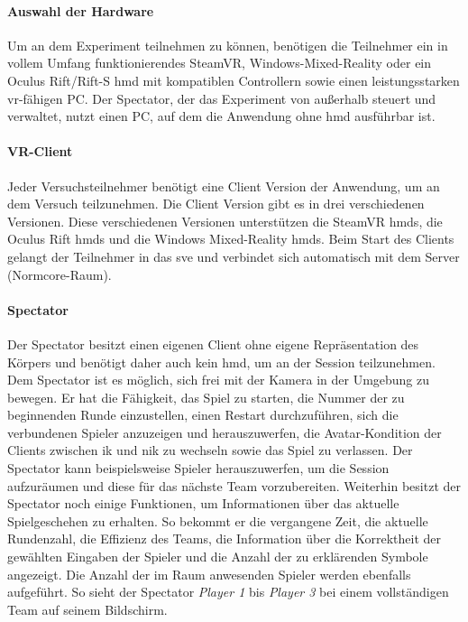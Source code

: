 \documentclass[a4paper,11pt]{article}%
\renewcommand{\\}{\vspace*{0.5\baselineskip} \newline}
\begin{document}
\paragraph{Auswahl der Hardware}
Um an dem Experiment teilnehmen zu können, benötigen die Teilnehmer ein in vollem Umfang funktionierendes SteamVR, Windows-Mixed-Reality oder ein Oculus Rift/Rift-S \ac{hmd} mit kompatiblen Controllern sowie einen leistungsstarken \ac{vr}-fähigen PC. Der Spectator, der das Experiment von außerhalb steuert und verwaltet, nutzt einen PC, auf dem die Anwendung ohne \ac{hmd} ausführbar ist.

\paragraph{VR-Client}
Jeder Versuchsteilnehmer benötigt eine Client Version der Anwendung, um an dem Versuch teilzunehmen. Die Client Version gibt es in drei verschiedenen Versionen. Diese verschiedenen Versionen unterstützen die SteamVR \ac{hmd}s, die Oculus Rift \ac{hmd}s und die Windows Mixed-Reality \ac{hmd}s. Beim Start des Clients gelangt der Teilnehmer in das \ac{sve} und verbindet sich automatisch mit dem Server (Normcore-Raum).

\paragraph{Spectator}
Der Spectator besitzt einen eigenen Client ohne eigene Repräsentation des Körpers und benötigt daher auch kein \ac{hmd}, um an der Session teilzunehmen. Dem Spectator ist es möglich, sich frei mit der Kamera in der Umgebung zu bewegen.
Er hat die Fähigkeit, das Spiel zu starten, die Nummer der zu beginnenden Runde einzustellen, einen Restart durchzuführen, sich die verbundenen Spieler anzuzeigen und herauszuwerfen, die Avatar-Kondition der Clients zwischen \ac{ik} und \ac{nik} zu wechseln sowie das Spiel zu verlassen.
Der Spectator kann beispielsweise Spieler herauszuwerfen, um die Session aufzuräumen und diese für das nächste Team vorzubereiten. Weiterhin besitzt der Spectator noch einige Funktionen, um Informationen über das aktuelle Spielgeschehen zu erhalten. So bekommt er die vergangene Zeit, die aktuelle Rundenzahl, die Effizienz des Teams, die Information über die Korrektheit der gewählten Eingaben der Spieler und die Anzahl der zu erklärenden Symbole angezeigt. Die Anzahl der im Raum anwesenden Spieler werden ebenfalls aufgeführt. So sieht der Spectator \textit{Player 1} bis \textit{Player 3} bei einem vollständigen Team auf seinem Bildschirm. 
\end{document}
